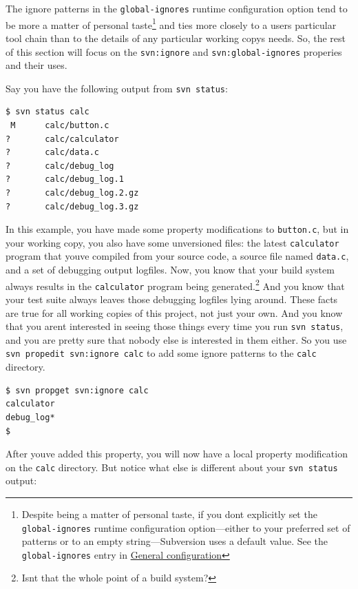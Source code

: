 The ignore patterns in the \texttt{global-ignores} runtime configuration
option tend to be more a matter of personal taste\footnote{Despite being
  a matter of personal taste, if you don\textquotesingle t explicitly
  set the \texttt{global-ignores} runtime configuration option---either
  to your preferred set of patterns or to an empty string---Subversion
  uses a default value. See the \texttt{global-ignores} entry in
  \hyperref[svn.advanced.confarea.opts.config]{General configuration}}
and ties more closely to a user\textquotesingle s particular tool chain
than to the details of any particular working copy\textquotesingle s
needs. So, the rest of this section will focus on the
\texttt{svn:ignore} and \texttt{svn:global-ignores} properies and their
uses.

Say you have the following output from \texttt{svn\ status}:

\begin{verbatim}
$ svn status calc
 M      calc/button.c
?       calc/calculator
?       calc/data.c
?       calc/debug_log
?       calc/debug_log.1
?       calc/debug_log.2.gz
?       calc/debug_log.3.gz
\end{verbatim}

In this example, you have made some property modifications to
\texttt{button.c}, but in your working copy, you also have some
unversioned files: the latest \texttt{calculator} program that
you\textquotesingle ve compiled from your source code, a source file
named \texttt{data.c}, and a set of debugging output logfiles. Now, you
know that your build system always results in the \texttt{calculator}
program being generated.\footnote{Isn\textquotesingle t that the whole
  point of a build system?} And you know that your test suite always
leaves those debugging logfiles lying around. These facts are true for
all working copies of this project, not just your own. And you know that
you aren\textquotesingle t interested in seeing those things every time
you run \texttt{svn\ status}, and you are pretty sure that nobody else
is interested in them either. So you use
\texttt{svn\ propedit\ svn:ignore\ calc} to add some ignore patterns to
the \texttt{calc} directory.

\begin{verbatim}
$ svn propget svn:ignore calc
calculator
debug_log*
$
\end{verbatim}

After you\textquotesingle ve added this property, you will now have a
local property modification on the \texttt{calc} directory. But notice
what else is different about your \texttt{svn\ status} output:

